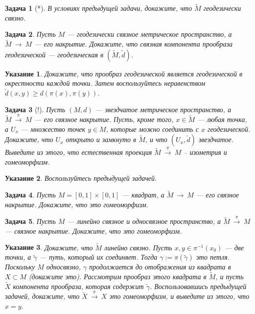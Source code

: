 \documentclass[12pt]{book}
\newcommand{\arrow}{{\:\longrightarrow\:}}
\theoremstyle{upshape}
\newtheorem{zadacha}{Задача}[chapter]
\theoremstyle{generic}
\theoremstyle{upshapenonumber}
\newtheorem{ukazanie}{Указание}[section]
\newcommand{\следствие}{%
     \refstepcounter{teorema}
     {\noindent\bf Следствие \thechapter.\arabic{teorema}:\ }}
\newcommand{\пример}{%
     \refstepcounter{teorema}
     {\noindent\bf Пример \thechapter.\arabic{teorema}:\ }}
\newcommand{\лемма}{%
     \refstepcounter{teorema}
     {\noindent\bf Лемма \thechapter.\arabic{teorema}:\ }}
\newcommand{\теорема}{%
     \refstepcounter{teorema}
     {\noindent\bf Теорема \thechapter.\arabic{teorema}:\ }}
\newcommand{\утверждение}{%
     \refstepcounter{teorema}
     {\noindent\bf Утверждение \thechapter.\arabic{teorema}:\ }}
\begin{document}
{\begin{zadacha}[*]
В условиях предыдущей задачи, докажите, что
$\tilde M$ геодезически связно.
\end{zadacha}

\begin{zadacha}  Пусть $M$ --- геодезически связное 
метрическое пространство, а $\tilde M\arrow M$ --- его
накрытие. Докажите, что связная компонента прообраза 
геодезической --- геодезическая в $(\tilde M, \tilde d)$. 
\end{zadacha}

\begin{ukazanie} 
Докажите, что прообраз геодезической 
является геодезической в окрестности каждой точки.
Затем воспользуйтесь неравенством
$\tilde d(x,y)\geq d(\pi(x),\pi(y))$.
\end{ukazanie}

\begin{zadacha}[!]
Пусть  $(M, d)$ --- звездчатое метрическое пространство,
а $\tilde M \stackrel\pi \arrow M$ --- его связное накрытие. 
Пусть, кроме того, $x\in \tilde M$ --- любая точка, а $U_x$ --- множество
точек $y\in M$, которые можно соединить с $x$
геодезической. Докажите, что $U_x$ открыто
и замкнуто в $\tilde M$, и что 
$(U_x, \tilde d)$ звездчатое.
Выведите из этого, что естественная
проекция $\tilde M \stackrel\pi \arrow M$ --
изометрия и гомеоморфизм.
\end{zadacha}

\begin{ukazanie}
Воспользуйтесь предыдущей задачей.
\end{ukazanie}

\begin{zadacha}
Пусть $M=[0,1]\times [0,1]$ --- квадрат, а 
$\tilde M \arrow M$ --- его связное накрытие. Докажите, что
это гомеоморфизм.
\end{zadacha}

\begin{zadacha}
Пусть $M$ --- линейно связное и односвязное пространство,
а $\tilde M \stackrel\pi\arrow M$ --- связное накрытие. Докажите, что
это гомеоморфизм.
\end{zadacha}

\begin{ukazanie}
Докажите, что $\tilde M$ линейно связно.
Пусть $x, y\in \pi^{-1}(x_0)$ --- две точки, а
$\tilde \gamma$ --- путь, который их соединяет.
Тогда $\gamma:=\pi(\tilde\gamma)$ это петля.
Поскольку $M$ односвязно, $\gamma$
продолжается до отображения из квадрата в
$X\subset M$ (докажите это).
Рассмотрим прообраз этого квадрата в 
$\tilde M$, и пусть $\tilde X$ компонента прообраза, 
которая содержит $\tilde\gamma$. Воспользовавшись
предыдущей задачей, докажите, что 
$\tilde X\stackrel\pi\arrow X$
это гомеоморфизм, и выведите из этого,
что $x=y$.
\end{ukazanie}

}
\end{document}
